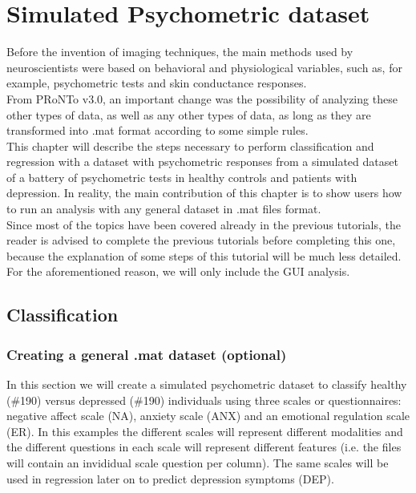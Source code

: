 
\chapter{Simulated Psychometric dataset}
\label{psychometric_dataset}
\minitoc

Before the invention of imaging techniques, the main methods used by neuroscientists were based on behavioral and physiological variables, such as, for example, psychometric tests and skin conductance responses.
\\

From PRoNTo v3.0, an important change was the possibility of analyzing these other types of data, as well as any other types of data, as long as they are transformed into .mat format according to some simple rules.
\\

This chapter will describe the steps necessary to perform classification and regression with a dataset with psychometric responses from a simulated dataset of a battery of psychometric tests in healthy controls and patients with depression. In reality, the main contribution of this chapter is to show users how to run an analysis with any general dataset in .mat files format.
\\

Since most of the topics have been covered already in the previous tutorials, the reader is advised to complete the previous tutorials before completing this one, because the explanation of some steps of this tutorial will be much less detailed. For the aforementioned reason, we will only include the GUI analysis.


\section{Classification}
\label{sec:psychometric_dataset_classification}


\subsection{Creating a general .mat dataset (optional)}
\label{ssec:psychometric_dataset_create_dataset}
In this section we will create a simulated psychometric dataset to classify healthy (\#190) versus depressed (\#190) individuals using three scales or questionnaires: negative affect scale (NA), anxiety scale (ANX) and an emotional regulation scale (ER). In this examples the different scales will represent different modalities and the different questions in each scale will represent different features (i.e. the files will contain an invididual scale question per column). The same scales will be used in regression later on to predict depression symptoms (DEP).

